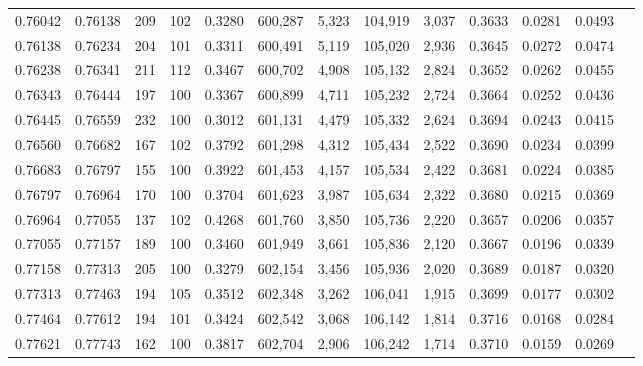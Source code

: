 \begin{tabular}{rrrrrrrrrrrrr}
0.76042 & 0.76138 &   209 & 102 &                                     0.3280 & 600,287 &   5,323 & 104,919 &   3,037 & 0.3633 & 0.0281 & 0.0493 \\
0.76138 & 0.76234 &   204 & 101 &                                     0.3311 & 600,491 &   5,119 & 105,020 &   2,936 & 0.3645 & 0.0272 & 0.0474 \\
0.76238 & 0.76341 &   211 & 112 &                                     0.3467 & 600,702 &   4,908 & 105,132 &   2,824 & 0.3652 & 0.0262 & 0.0455 \\
0.76343 & 0.76444 &   197 & 100 &                                     0.3367 & 600,899 &   4,711 & 105,232 &   2,724 & 0.3664 & 0.0252 & 0.0436 \\
0.76445 & 0.76559 &   232 & 100 &                                     0.3012 & 601,131 &   4,479 & 105,332 &   2,624 & 0.3694 & 0.0243 & 0.0415 \\
0.76560 & 0.76682 &   167 & 102 &                                     0.3792 & 601,298 &   4,312 & 105,434 &   2,522 & 0.3690 & 0.0234 & 0.0399 \\
0.76683 & 0.76797 &   155 & 100 &                                     0.3922 & 601,453 &   4,157 & 105,534 &   2,422 & 0.3681 & 0.0224 & 0.0385 \\
0.76797 & 0.76964 &   170 & 100 &                                     0.3704 & 601,623 &   3,987 & 105,634 &   2,322 & 0.3680 & 0.0215 & 0.0369 \\
0.76964 & 0.77055 &   137 & 102 &                                     0.4268 & 601,760 &   3,850 & 105,736 &   2,220 & 0.3657 & 0.0206 & 0.0357 \\
0.77055 & 0.77157 &   189 & 100 &                                     0.3460 & 601,949 &   3,661 & 105,836 &   2,120 & 0.3667 & 0.0196 & 0.0339 \\
0.77158 & 0.77313 &   205 & 100 &                                     0.3279 & 602,154 &   3,456 & 105,936 &   2,020 & 0.3689 & 0.0187 & 0.0320 \\
0.77313 & 0.77463 &   194 & 105 &                                     0.3512 & 602,348 &   3,262 & 106,041 &   1,915 & 0.3699 & 0.0177 & 0.0302 \\
0.77464 & 0.77612 &   194 & 101 &                                     0.3424 & 602,542 &   3,068 & 106,142 &   1,814 & 0.3716 & 0.0168 & 0.0284 \\
0.77621 & 0.77743 &   162 & 100 &                                     0.3817 & 602,704 &   2,906 & 106,242 &   1,714 & 0.3710 & 0.0159 & 0.0269 \\

\end{tabular}
